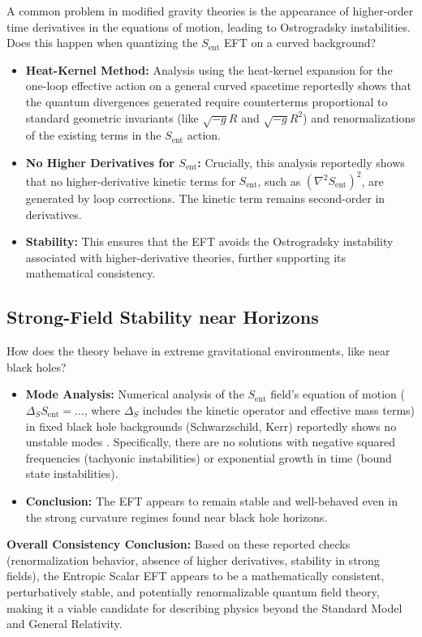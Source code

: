 \documentclass[11pt]{article}
\begin{document}
A common problem in modified gravity theories is the appearance of higher-order time derivatives in the equations of motion, leading to Ostrogradsky instabilities. Does this happen when quantizing the $S_{\mathrm{ent}}$ EFT on a curved background?
\begin{itemize}
    \item \textbf{Heat-Kernel Method:} Analysis using the heat-kernel expansion for the one-loop effective action on a general curved spacetime reportedly shows that the quantum divergences generated require counterterms proportional to standard geometric invariants (like $\sqrt{-g}R$ and $\sqrt{-g}R^2$) and renormalizations of the existing terms in the $S_{\mathrm{ent}}$ action.
    \item \textbf{No Higher Derivatives for $S_{\mathrm{ent}}$:} Crucially, this analysis reportedly shows that no higher-derivative kinetic terms for $S_{\mathrm{ent}}$, such as $(\nabla^2 S_{\mathrm{ent}})^2$, are generated by loop corrections. The kinetic term remains second-order in derivatives.
    \item \textbf{Stability:} This ensures that the EFT avoids the Ostrogradsky instability associated with higher-derivative theories, further supporting its mathematical consistency.
\end{itemize}

\subsection{Strong-Field Stability near Horizons}

How does the theory behave in extreme gravitational environments, like near black holes?
\begin{itemize}
    \item \textbf{Mode Analysis:} Numerical analysis of the $S_{\mathrm{ent}}$ field's equation of motion ($\Delta_S S_{\mathrm{ent}} = \dots$, where $\Delta_S$ includes the kinetic operator and effective mass terms) in fixed black hole backgrounds (Schwarzschild, Kerr) reportedly shows no unstable modes \cite{Chinitz2025}. Specifically, there are no solutions with negative squared frequencies (tachyonic instabilities) or exponential growth in time (bound state instabilities).
    \item \textbf{Conclusion:} The EFT appears to remain stable and well-behaved even in the strong curvature regimes found near black hole horizons.
\end{itemize}

\textbf{Overall Consistency Conclusion:} Based on these reported checks (renormalization behavior, absence of higher derivatives, stability in strong fields), the Entropic Scalar EFT appears to be a mathematically consistent, perturbatively stable, and potentially renormalizable quantum field theory, making it a viable candidate for describing physics beyond the Standard Model and General Relativity.
\end{document}
